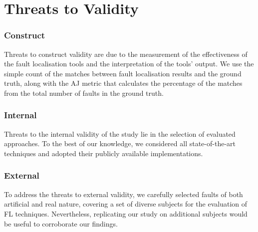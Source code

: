 
\section{Threats to Validity}
\label{sec:threats}

\subsubsection{Construct}
Threats to construct validity are due to the measurement of the
effectiveness of the fault localisation tools and the interpretation of the tools' output. We use the simple count of the matches between fault localisation results and the ground truth, along with the AJ metric that calculates the percentage of the matches from the total number of faults in the ground truth.

\subsubsection{Internal}
Threats to the internal validity of the study lie in the selection of evaluated approaches. To the best of our knowledge, we considered all state-of-the-art techniques and adopted their publicly available implementations.

\subsubsection{External}
To address the threats to external validity, we carefully selected faults of both artificial and real nature, covering a set of diverse subjects for the evaluation of FL techniques. Nevertheless, replicating our study on additional subjects would be useful to corroborate our findings.